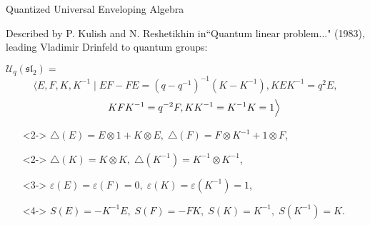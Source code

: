 \documentclass{beamer}
\newcommand\1{_{(1)}}
\newcommand\2{_{(2)}}
\begin{document}
\begin{frame}{Quantized Universal Enveloping Algebra}


Described by P. Kulish and N. Reshetikhin in``Quantum linear problem..." (1983), leading Vladimir Drinfeld to quantum groups:

$\mathcal{U}_q(\mathfrak{sl}
_2)=$
\[
\Big\langle E,F,K,K^{-1}\;\vert\;EF-FE=(q-q^{-1})^{-1}\left(K-K^{-1}\right), KEK^{-1}=q^2 E, \]\[\hspace{4ex}KFK^{-1}=q^{-2}F, KK^{-1}=K^{-1}K=1\Big\rangle
\]
\vspace{0.5ex}
\begin{itemize}
\setlength{\itemsep}{1.5ex}
    \item[]<2-> $\triangle(E)=E\otimes 1+K\otimes E,\; \triangle(F)=F\otimes K^{-1}+ 1\otimes F$, \item[]<2-> $\triangle(K)=K\otimes K,\; \triangle(K^{-1})=K^{-1}\otimes K^{-1}$,
    \item[]<3-> $\varepsilon(E)=\varepsilon(F)=0,\; \varepsilon(K)=\varepsilon(K^{-1})=1$,
    \item[]<4-> $S(E)=-K^{-1}E,\; S(F)=-F K, \;S(K)=K^{-1},\; S(K^{-1})=K$.
\end{itemize}


\end{frame}
\end{document}
